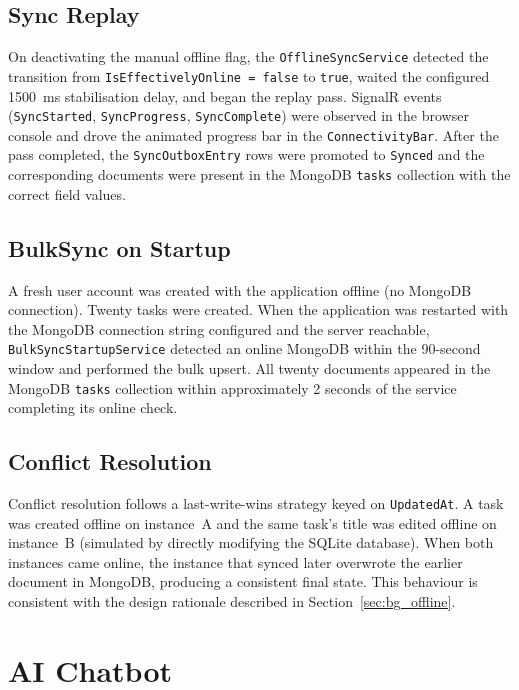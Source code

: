 \subsection*{Sync Replay}

On deactivating the manual offline flag, the \texttt{OfflineSyncService} detected the
transition from \texttt{IsEffectivelyOnline = false} to \texttt{true}, waited the
configured 1500~ms stabilisation delay, and began the replay pass.
SignalR events (\texttt{SyncStarted}, \texttt{SyncProgress},
\texttt{SyncComplete}) were observed in the browser console and drove the animated
progress bar in the \texttt{ConnectivityBar}.
After the pass completed, the \texttt{SyncOutboxEntry} rows were promoted to
\texttt{Synced} and the corresponding documents were present in the MongoDB
\texttt{tasks} collection with the correct field values.

\subsection*{BulkSync on Startup}

A fresh user account was created with the application offline (no MongoDB connection).
Twenty tasks were created.
When the application was restarted with the MongoDB connection string configured and
the server reachable, \texttt{BulkSyncStartupService} detected an online MongoDB within
the 90-second window and performed the bulk upsert.
All twenty documents appeared in the MongoDB \texttt{tasks} collection within
approximately 2 seconds of the service completing its online check.

\subsection*{Conflict Resolution}

Conflict resolution follows a last-write-wins strategy keyed on \texttt{UpdatedAt}.
A task was created offline on instance~A and the same task's title was edited offline
on instance~B (simulated by directly modifying the SQLite database).
When both instances came online, the instance that synced later overwrote the earlier
document in MongoDB, producing a consistent final state.
This behaviour is consistent with the design rationale described in
Section~\ref{sec:bg_offline}.

\section{AI Chatbot}\label{sec:res_ai}

